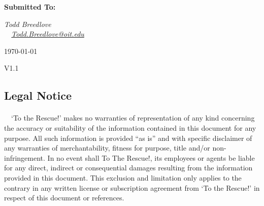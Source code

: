 \documentclass[12pt]{report}
\begin{document}
\begin{titlepage}
	\begin{multicols}{2}
		{\Large\bfseries
			Submitted To: \par}
		\columnbreak
		\begin{flushleft}
			{\Large\itshape Todd Breedlove \\
				\ \ \normalsize\normalfont \href{mailto:Todd.Breedlove@oit.edu}{Todd.Breedlove@oit.edu} \\
			\par}
		\end{flushleft}
	\end{multicols}
	
	\vfill
	
	{\large \today \par}
	{\large V1.1 \par}
	\footnotesize

\end{titlepage}




	\thispagestyle{fancy}
	\subsection*{Legal Notice}
	\label{subsec:LegalNotice}
		\paragraph{}\ \ ‘To the Rescue!’ makes no warranties of representation of any kind concerning the accuracy or suitability of the information contained in this document for any purpose. All such information is provided “as is” and with specific disclaimer of any warranties of merchantability, fitness for purpose, title and/or non-infringement. In no event shall To The Rescue!, its employees or agents be liable for any direct, indirect or consequential damages resulting from the information provided in this document. This exclusion and limitation only applies to the contrary in any written license or subscription agreement from ‘To the Rescue!’ in respect of this document or references. 
		
\end{document}
